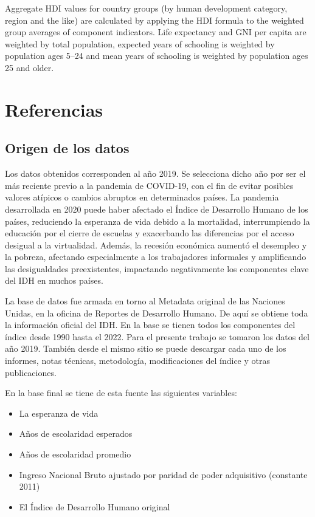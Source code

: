 \documentclass[
  10pt,
]{article}
\begin{document}
Aggregate HDI values for country groups (by human development category,
region and the like) are calculated by applying the HDI formula to the
weighted group averages of component indicators. Life expectancy and GNI
per capita are weighted by total population, expected years of schooling
is weighted by population ages 5--24 and mean years of schooling is
weighted by population ages 25 and older.

\pagebreak

\section{Referencias}\label{referencias}

\subsection{Origen de los datos}\label{origen-de-los-datos}

Los datos obtenidos corresponden al año 2019. Se selecciona dicho año
por ser el más reciente previo a la pandemia de COVID-19, con el fin de
evitar posibles valores atípicos o cambios abruptos en determinados
países. La pandemia desarrollada en 2020 puede haber afectado el Índice
de Desarrollo Humano de los países, reduciendo la esperanza de vida
debido a la mortalidad, interrumpiendo la educación por el cierre de
escuelas y exacerbando las diferencias por el acceso desigual a la
virtualidad. Además, la recesión económica aumentó el desempleo y la
pobreza, afectando especialmente a los trabajadores informales y
amplificando las desigualdades preexistentes, impactando negativamente
los componentes clave del IDH en muchos países.

La base de datos fue armada en torno al Metadata original de las
Naciones Unidas, en la oficina de Reportes de Desarrollo Humano. De aquí
se obtiene toda la información oficial del IDH. En la base se tienen
todos los componentes del índice desde 1990 hasta el 2022. Para el
presente trabajo se tomaron los datos del año 2019. También desde el
mismo sitio se puede descargar cada uno de los informes, notas técnicas,
metodología, modificaciones del índice y otras publicaciones.

En la base final se tiene de esta fuente las siguientes variables:

\begin{itemize}
\item
  La esperanza de vida
\item
  Años de escolaridad esperados
\item
  Años de escolaridad promedio
\item
  Ingreso Nacional Bruto ajustado por paridad de poder adquisitivo
  (constante 2011)
\item
  El Índice de Desarrollo Humano original
\end{itemize}
\end{document}
